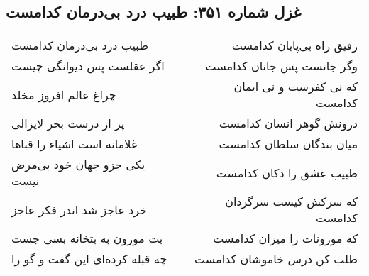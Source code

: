 \begin{center}
\section*{غزل شماره ۳۵۱: طبیب درد بی‌درمان کدامست}
\label{sec:0351}
\begin{longtable}{l p{0.5cm} r}
طبیب درد بی‌درمان کدامست
&&
رفیق راه بی‌پایان کدامست
\\
اگر عقلست پس دیوانگی چیست
&&
وگر جانست پس جانان کدامست
\\
چراغ عالم افروز مخلد
&&
که نی کفرست و نی ایمان کدامست
\\
پر از درست بحر لایزالی
&&
درونش گوهر انسان کدامست
\\
غلامانه است اشیاء را قباها
&&
میان بندگان سلطان کدامست
\\
یکی جزو جهان خود بی‌مرض نیست
&&
طبیب عشق را دکان کدامست
\\
خرد عاجز شد اندر فکر عاجز
&&
که سرکش کیست سرگردان کدامست
\\
بت موزون به بتخانه بسی جست
&&
که موزونات را میزان کدامست
\\
چه قبله کرده‌ای این گفت و گو را
&&
طلب کن درس خاموشان کدامست
\\
\end{longtable}
\end{center}
